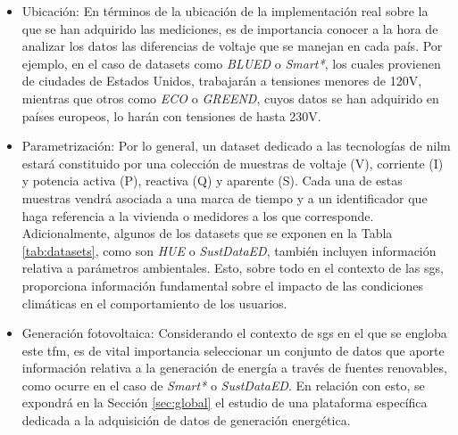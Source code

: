 \begin{itemize}
    \item Ubicación: En términos de la ubicación de la implementación real sobre la que se han adquirido las mediciones, es de importancia conocer a la hora de analizar los datos las diferencias de voltaje que se manejan en cada país. Por ejemplo, en el caso de datasets como \textit{BLUED} o \textit{Smart*}, los cuales provienen de ciudades de Estados Unidos, trabajarán a tensiones menores de 120V, mientras que otros como \textit{ECO} o \textit{GREEND}, cuyos datos se han adquirido en países europeos, lo harán con tensiones de hasta 230V. \cite{greend} \cite{powercons}
    \item Parametrización: Por lo general, un dataset dedicado a las tecnologías de \gls{nilm} estará constituido por una colección de muestras de voltaje (V), corriente (I) y potencia activa (P), reactiva (Q) y aparente (S). Cada una de estas muestras vendrá asociada a una marca de tiempo y a un identificador que haga referencia a la vivienda o medidores a los que corresponde. Adicionalmente, algunos de los datasets que se exponen en la Tabla \ref{tab:datasets}, como son \textit{HUE} o \textit{SustDataED}, también incluyen información relativa a parámetros ambientales. Esto, sobre todo en el contexto de las \gls{sg}s, proporciona información fundamental sobre el impacto de las condiciones climáticas en el comportamiento de los usuarios.
    \item Generación fotovoltaica: Considerando el contexto de \gls{sg}s en el que se engloba este \gls{tfm}, es de vital importancia seleccionar un conjunto de datos que aporte información relativa a la generación de energía a través de fuentes renovables, como ocurre en el caso de \textit{Smart*} o \textit{SustDataED}. En relación con esto, se expondrá en la Sección \ref{sec:global} el estudio de una plataforma específica dedicada a la adquisición de datos de generación energética.
\end{itemize}

